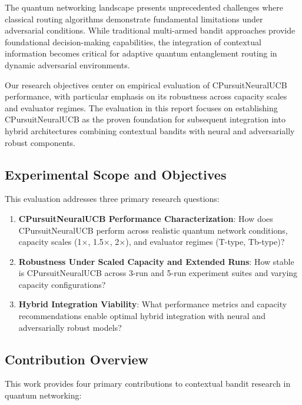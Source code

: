 \documentclass[12pt,a4paper]{article}
\begin{document}
The quantum networking landscape presents unprecedented challenges where classical routing algorithms demonstrate fundamental limitations under adversarial conditions. While traditional multi-armed bandit approaches provide foundational decision-making capabilities, the integration of contextual information becomes critical for adaptive quantum entanglement routing in dynamic adversarial environments.

Our research objectives center on empirical evaluation of CPursuitNeuralUCB performance, with particular emphasis on its robustness across capacity scales and evaluator regimes. The evaluation in this report focuses on establishing CPursuitNeuralUCB as the proven foundation for subsequent integration into hybrid architectures combining contextual bandits with neural and adversarially robust components.

\subsection{Experimental Scope and Objectives}

This evaluation addresses three primary research questions:

\begin{enumerate}
\item \textbf{CPursuitNeuralUCB Performance Characterization}: How does CPursuitNeuralUCB perform across realistic quantum network conditions, capacity scales (1$\times$, 1.5$\times$, 2$\times$), and evaluator regimes (T-type, Tb-type)?
\item \textbf{Robustness Under Scaled Capacity and Extended Runs}: How stable is CPursuitNeuralUCB across 3-run and 5-run experiment suites and varying capacity configurations?
\item \textbf{Hybrid Integration Viability}: What performance metrics and capacity recommendations enable optimal hybrid integration with neural and adversarially robust models?
\end{enumerate}

\subsection{Contribution Overview}

This work provides four primary contributions to contextual bandit research in quantum networking:
\end{document}
